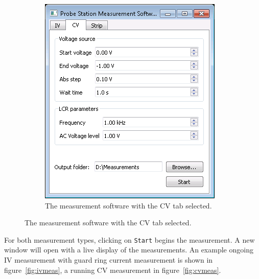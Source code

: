 \documentclass[a4paper]{article}
\begin{document}
\begin{figure}[hbtp]
\begin{subfigure}[t]{0.475\textwidth}
\includegraphics[width=\linewidth]{pictures/softcv.png}
\caption[Software with the CV Tab]{The measurement software with the CV tab selected.}
\label{fig:softwareopencv}
\end{subfigure}
\end{figure}

For both measurement types, clicking on {\tt Start} begins the measurement.
A new window will open with a live display of the measurements.
An example ongoing IV measurement with guard ring current measurement is shown in figure~\ref{fig:ivmeas}, a running CV measurement in figure~\ref{fig:cvmeas}.\\
\end{document}
